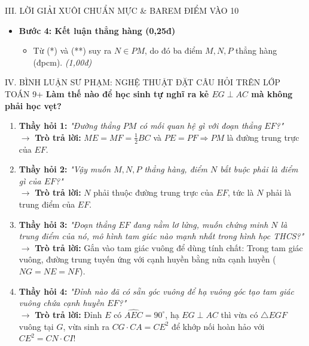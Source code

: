 \documentclass[11pt,a4paper]{article}
\begin{document}
\begin{solutionbox}{III. LỜI GIẢI XUÔI CHUẨN MỰC \& BAREM ĐIỂM VÀO 10}
\begin{itemize}[leftmargin=5mm]
\begin{itemize}
        \item Suy ra $NE = NF$, tức là $N$ là trung điểm của đoạn thẳng $EF$. (**)
    \end{itemize}
    \item \textbf{Bước 4: Kết luận thẳng hàng (0,25đ)}
    \begin{itemize}
        \item Từ (*) và (**) suy ra $N \in PM$, do đó ba điểm $M, N, P$ thẳng hàng (đpcm). \hfill \textit{(1,00đ)}
    \end{itemize}
\end{itemize}

\end{solutionbox}

\newpage

\begin{pedagogybox}{IV. BÌNH LUẬN SƯ PHẠM: NGHỆ THUẬT ĐẶT CÂU HỎI TRÊN LỚP TOÁN 9+}
\textbf{Làm thế nào để học sinh tự nghĩ ra kẻ $EG \perp AC$ mà không phải học vẹt?}
\begin{enumerate}[leftmargin=5mm]
    \item \textbf{Thầy hỏi 1:} \textit{"Đường thẳng $PM$ có mối quan hệ gì với đoạn thẳng $EF$?"}\\
    $\to$ \textbf{Trò trả lời:} $ME = MF = \frac{1}{2}BC$ và $PE = PF \Rightarrow PM$ là đường trung trực của $EF$.
    \item \textbf{Thầy hỏi 2:} \textit{"Vậy muốn $M, N, P$ thẳng hàng, điểm $N$ bắt buộc phải là điểm gì của $EF$?"}\\
    $\to$ \textbf{Trò trả lời:} $N$ phải thuộc đường trung trực của $EF$, tức là $N$ phải là trung điểm của $EF$.
    \item \textbf{Thầy hỏi 3:} \textit{"Đoạn thẳng $EF$ đang nằm lơ lửng, muốn chứng minh $N$ là trung điểm của nó, mô hình tam giác nào mạnh nhất trong hình học THCS?"}\\
    $\to$ \textbf{Trò trả lời:} Gắn vào tam giác vuông để dùng tính chất: Trong tam giác vuông, đường trung tuyến ứng với cạnh huyền bằng nửa cạnh huyền ($NG = NE = NF$).
    \item \textbf{Thầy hỏi 4:} \textit{"Đỉnh nào đã có sẵn góc vuông để hạ vuông góc tạo tam giác vuông chứa cạnh huyền $EF$?"}\\
    $\to$ \textbf{Trò trả lời:} Đỉnh $E$ có $\widehat{AEC} = 90^\circ$, hạ $EG \perp AC$ thì vừa có $\triangle EGF$ vuông tại $G$, vừa sinh ra $CG \cdot CA = CE^2$ để khớp nối hoàn hảo với $CE^2 = CN \cdot CI$!
\end{enumerate}
\end{pedagogybox}
\end{document}

